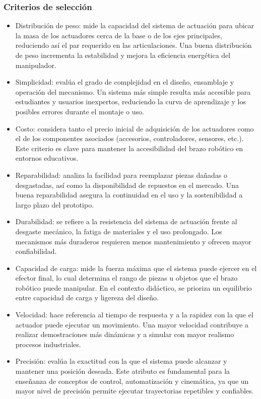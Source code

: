 \subsubsection{Criterios de selección}

\begin{itemize}
  \item Distribución de peso: mide la capacidad del sistema de actuación para ubicar la masa de los actuadores cerca de la base o de los ejes principales, reduciendo así el par requerido en las articulaciones. Una buena distribución de peso incrementa la estabilidad y mejora la eficiencia energética del manipulador.
  \item Simplicidad: evalúa el grado de complejidad en el diseño, ensamblaje y operación del mecanismo. Un sistema más simple resulta más accesible para estudiantes y usuarios inexpertos, reduciendo la curva de aprendizaje y los posibles errores durante el montaje o uso.
  \item Costo: considera tanto el precio inicial de adquisición de los actuadores como el de los componentes asociados (accesorios, controladores, sensores, etc.). Este criterio es clave para mantener la accesibilidad del brazo robótico en entornos educativos.
  \item Reparabilidad: analiza la facilidad para reemplazar piezas dañadas o desgastadas, así como la disponibilidad de repuestos en el mercado. Una buena reparabilidad asegura la continuidad en el uso y la sostenibilidad a largo plazo del prototipo.
  \item Durabilidad: se refiere a la resistencia del sistema de actuación frente al desgaste mecánico, la fatiga de materiales y el uso prolongado. Los mecanismos más duraderos requieren menos mantenimiento y ofrecen mayor confiabilidad.
  \item Capacidad de carga: mide la fuerza máxima que el sistema puede ejercer en el efector final, lo cual determina el rango de piezas u objetos que el brazo robótico puede manipular. En el contexto didáctico, se prioriza un equilibrio entre capacidad de carga y ligereza del diseño.
  \item Velocidad: hace referencia al tiempo de respuesta y a la rapidez con la que el actuador puede ejecutar un movimiento. Una mayor velocidad contribuye a realizar demostraciones más dinámicas y a simular con mayor realismo procesos industriales.
  \item Precisión: evalúa la exactitud con la que el sistema puede alcanzar y mantener una posición deseada. Este atributo es fundamental para la enseñanza de conceptos de control, automatización y cinemática, ya que un mayor nivel de precisión permite ejecutar trayectorias repetibles y confiables.
\end{itemize}


